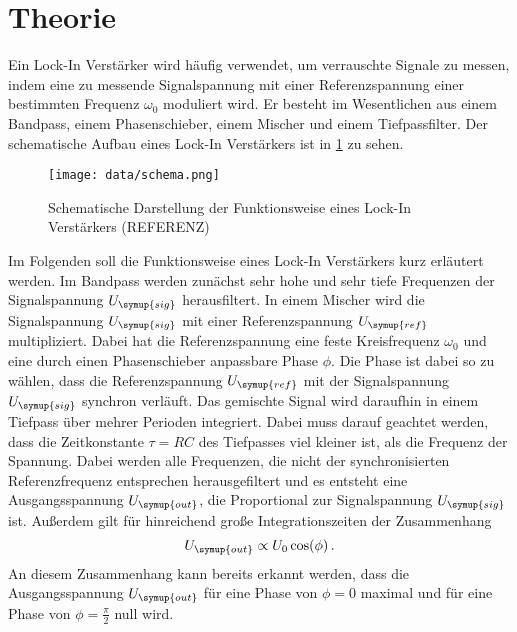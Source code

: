 \section{Theorie}
\label{sec:Theorie}

Ein Lock-In Verstärker wird häufig verwendet, um verrauschte Signale zu messen,
indem eine zu messende Signalspannung mit einer Referenzspannung einer bestimmten
Frequenz $\omega_0$ moduliert wird.
Er besteht im Wesentlichen aus einem Bandpass, einem Phasenschieber, einem Mischer
und einem Tiefpassfilter. Der schematische Aufbau eines Lock-In Verstärkers ist
in \ref{fig:schema} zu sehen.

\begin{figure}
  \centering
  \texttt{[image: data/schema.png]}
  \caption{Schematische Darstellung der Funktionsweise eines Lock-In Verstärkers
  (REFERENZ)}
  \label{fig:schema}
\end{figure}


Im Folgenden soll die Funktionsweise eines Lock-In Verstärkers kurz erläutert
werden. Im Bandpass werden zunächst sehr hohe und sehr tiefe Frequenzen der
Signalspannung $U_{\symup{sig}}$ herausfiltert. In einem Mischer wird die
Signalspannung $U_{\symup{sig}}$ mit einer Referenzspannung $U_{\symup{ref}}$
multipliziert. Dabei hat die Referenzspannung eine feste Kreisfrequenz
$\omega_0$ und eine durch einen Phasenschieber anpassbare Phase $\phi$. Die Phase
ist dabei so zu wählen, dass die Referenzspannung $U_{\symup{ref}}$ mit der
Signalspannung $U_{\symup{sig}}$ synchron verläuft. Das gemischte Signal wird
daraufhin in einem Tiefpass über mehrer Perioden integriert. Dabei muss darauf
geachtet werden, dass  die Zeitkonstante $\tau=RC$ des Tiefpasses viel kleiner
ist, als die Frequenz der Spannung. Dabei werden alle Frequenzen, die nicht
der synchronisierten Referenzfrequenz entsprechen herausgefiltert und es entsteht
eine Ausgangsspannung $U_{\symup{out}}$, die Proportional zur Signalspannung
$U_{\symup{sig}}$ ist. Außerdem gilt für hinreichend große Integrationszeiten
der Zusammenhang
\begin{equation}
  U_{\symup{out}}\propto U_0 \cos(\phi) \,.
\end{equation}
An diesem Zusammenhang kann bereits erkannt werden, dass die Ausgangsspannung
$U_{\symup{out}}$ für eine Phase von $\phi=0$ maximal und für eine Phase von
$\phi=\frac{\pi}{2}$ null wird.
